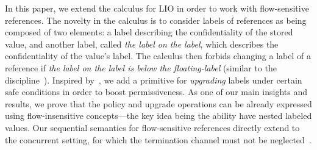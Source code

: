 In this paper, we extend the calculus for LIO in order to work with
flow-sensitive references.
The novelty in the calculus is to consider labels of references as being composed of two
elements: a label describing the confidentiality of the stored value, and
another label, called \emph{the label on the label}, which describes the
confidentiality of the value's label. The calculus then forbids changing a
label of a reference if \emph{the label on the label is below the
  floating-label} (similar to the {\nsu}
discipline~).%
Inspired by~\cite{Hedin13}, we add
a primitive for \emph{upgrading} labels under certain safe conditions in
order to boost permissiveness. As one of our main insights and results, we prove
that the {\nsu} policy and upgrade operations can be already expressed using
flow-insensitive concepts---the key idea being the ability have nested labeled
values.  
Our sequential semantics for flow-sensitive references directly extend to the
concurrent setting, for which the termination channel must not be
neglected~\cite{stefan:addressing-covert}.

